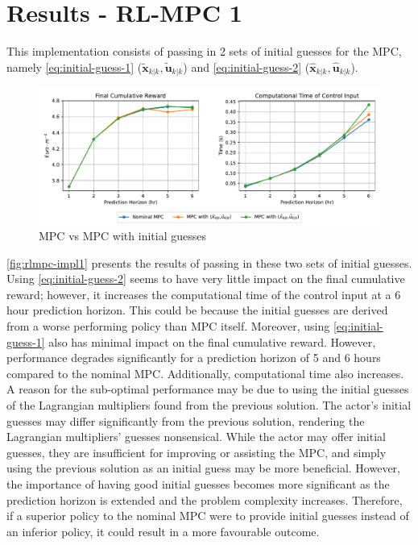 \section{Results - RL-MPC 1}
This implementation consists of passing in 2 sets of initial guesses for the MPC, namely \autoref{eq:initial-guess-1} ($\tilde{\mathbf{x}}_{k|k},\tilde{\mathbf{u}}_{k|k}$) and \autoref{eq:initial-guess-2} ($\hat{\mathbf{x}}_{k|k},\hat{\mathbf{u}}_{k|k}$).
\begin{figure}[H]
	\centering
	\includegraphics[width=\textwidth]{figures/rl_mpc_impl_1.pdf}
	\caption{MPC vs MPC with initial guesses}
	\label{fig:rlmpc-impl1}
\end{figure}

\autoref{fig:rlmpc-impl1} presents the results of passing in  these two sets of initial guesses. Using \autoref{eq:initial-guess-2} seems to have very little impact on the final cumulative reward; however, it increases the computational time of the control input at a 6 hour prediction horizon. This could be because the initial guesses are derived from a worse performing policy than MPC itself. Moreover, using \autoref{eq:initial-guess-1} also has minimal impact on the final cumulative reward. However, performance degrades significantly for a prediction horizon of 5 and 6 hours compared to the nominal MPC. Additionally, computational time also increases. A reason for the sub-optimal performance may be due to using the initial guesses of the Lagrangian multipliers found from the previous solution. The actor's initial guesses may differ significantly from the previous solution, rendering the Lagrangian multipliers' guesses nonsensical. While the actor may offer initial guesses, they are insufficient for improving or assisting the MPC, and simply using the previous solution as an initial guess may be more beneficial. However, the importance of having good initial guesses becomes more significant as the prediction horizon is extended and the problem complexity increases. Therefore, if a superior policy to the nominal MPC were to provide initial guesses instead of an inferior policy, it could result in a more favourable outcome.


